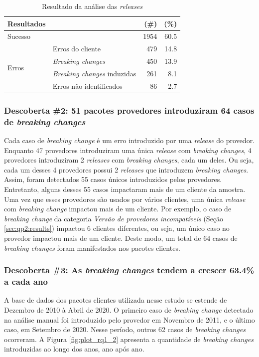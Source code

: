 \begin{table}
	\centering
	\caption{Resultado da análise das \textit{releases}}
	\begin{tabular}{llrr}
		\toprule
		\textbf{Resultados} & \phantom{ab}    &\textbf{(\#)} & \textbf{(\%)} \\ \toprule
		Sucesso             & \phantom{ab}    & 1954         & 60.5          \\ \hline
		\multirow{4}{*}{Erros}
		& Erros do cliente                    & 479          & 14.8          \\
		& \textit{Breaking changes}           & 450          & 13.9          \\
		& \textit{Breaking changes} induzidas & 261          & 8.1           \\
		& Erros não identificados             & 86           & 2.7           \\
		\bottomrule
	\end{tabular}
	\label{tab:releases_analyses}
\end{table}

\subsubsection{Descoberta \#2: 51 pacotes provedores introduziram 64 casos de \textit{breaking changes}}

Cada caso de \textit{breaking change} é um erro introduzido por uma \textit{release} do provedor. Enquanto 47 provedores introduziram uma única \textit{release} com \textit{breaking changes}, 4 provedores introduziram 2 \textit{releases} com \textit{breaking changes}, cada um deles. Ou seja, cada um desses 4 provedores possui 2 \textit{releases} que introduzem \textit{breaking changes}. Assim, foram detectados 55 casos únicos introduzidos pelos provedores. Entretanto, alguns desses 55 casos impactaram mais de um cliente da amostra. Uma vez que esses provedores são usados por vários clientes, uma única \textit{release} com \textit{breaking change} impactou mais de um cliente. Por exemplo, o caso de \textit{breaking change} da categoria \textit{Versão de provedores incompatíveis} (Seção \ref{sec:qp2:results}) impactou 6 clientes diferentes, ou seja, um único caso no provedor impactou mais de um cliente. Deste modo, um total de 64 casos de \textit{breaking changes} foram manifestados nos pacotes clientes.

\subsubsection{Descoberta \#3: As \textit{breaking changes} tendem a crescer 63.4\% a cada ano}
A base de dados dos pacotes clientes utilizada nesse estudo se estende de Dezembro de 2010 à Abril de 2020. O primeiro caso de \textit{breaking change} detectado na análise manual foi introduzido pelo provedor em Novembro de 2011, e o último caso, em Setembro de 2020. Nesse período, outros 62 casos de \textit{breaking changes} ocorreram. A Figura \ref{fig:plot_rq1_2} apresenta a quantidade de \textit{breaking changes} introduzidas ao longo dos anos, ano após ano.

